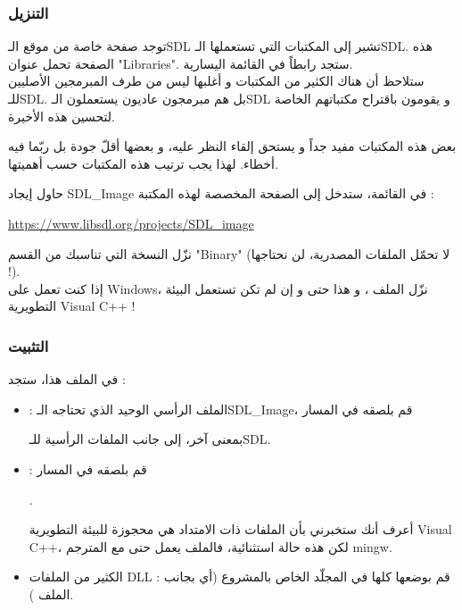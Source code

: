 \subsubsection{التنزيل}

توجد صفحة خاصة من موقع الـ\textenglish{SDL}
تشير إلى المكتبات التي تستعملها الـ\textenglish{SDL}.
هذه الصفحة تحمل عنوان
"\textenglish{Libraries}".
ستجد رابطاً في القائمة اليسارية.\\
ستلاحظ أن هناك الكثير من المكتبات و أغلبها ليس من طرف المبرمجين الأصليين للـ\textenglish{SDL}.
بل هم مبرمجون عاديون يستعملون الـ\textenglish{SDL}
و يقومون باقتراح مكتباتهم الخاصة لتحسين هذه الأخيرة.

بعض هذه المكتبات مفيد جداً و يستحق إلقاء النظر عليه، و بعضها أقلّ جودة بل ربّما فيه أخطاء. لهذا يجب ترتيب هذه المكتبات حسب أهميتها.

حاول إيجاد
\textenglish{SDL\_Image}
في القائمة، ستدخل إلى الصفحة المخصصة لهذه المكتبة :

\url{https://www.libsdl.org/projects/SDL_image}

نزّل النسخة التي تناسبك من القسم
"\textenglish{Binary}"
(لا تحمّل الملفات المصدرية، لن نحتاجها !).\\
إذا كنت تعمل على
\textenglish{Windows}،
نزّل الملف
،
و هذا حتى و إن لم تكن تستعمل البيئة التطويرية 
\textenglish{Visual C++} !

\subsubsection{التثبيت}

في الملف
هذا، ستجد :

\begin{itemize}
	\item {} :
	 الملف الرأسي الوحيد الذي تحتاجه الـ\textenglish{SDL\_Image}،
	 قم بلصقه في المسار
	 
	 
	 بمعنى آخر، إلى جانب الملفات الرأسية للـ\textenglish{SDL}.
	\item {} :
	قم بلصقه في المسار
	
	.
	
	أعرف أنك ستخبرني بأن الملفات ذات الامتداد
	هي محجوزة للبيئة التطويرية
	\textenglish{Visual C++}،
	لكن هذه حالة استثنائية، فالملف 
	يعمل حتى مع المترجم 
	\textenglish{mingw}.
	\item الكثير من الملفات
	\textenglish{DLL} : 
	قم بوضعها كلها في المجلّد الخاص بالمشروع (أي بجانب الملف 
	).
\end{itemize}

